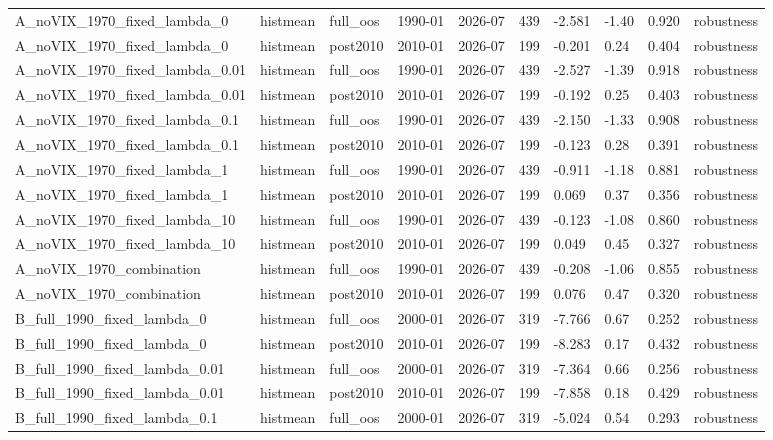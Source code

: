 \begin{table}
\begin{tabular}{lllllrllll}
A\_noVIX\_1970\_fixed\_lambda\_0 & histmean & full\_oos & 1990-01 & 2026-07 & 439 & -2.581 & -1.40 & 0.920 & robustness \\
A\_noVIX\_1970\_fixed\_lambda\_0 & histmean & post2010 & 2010-01 & 2026-07 & 199 & -0.201 & 0.24 & 0.404 & robustness \\
A\_noVIX\_1970\_fixed\_lambda\_0.01 & histmean & full\_oos & 1990-01 & 2026-07 & 439 & -2.527 & -1.39 & 0.918 & robustness \\
A\_noVIX\_1970\_fixed\_lambda\_0.01 & histmean & post2010 & 2010-01 & 2026-07 & 199 & -0.192 & 0.25 & 0.403 & robustness \\
A\_noVIX\_1970\_fixed\_lambda\_0.1 & histmean & full\_oos & 1990-01 & 2026-07 & 439 & -2.150 & -1.33 & 0.908 & robustness \\
A\_noVIX\_1970\_fixed\_lambda\_0.1 & histmean & post2010 & 2010-01 & 2026-07 & 199 & -0.123 & 0.28 & 0.391 & robustness \\
A\_noVIX\_1970\_fixed\_lambda\_1 & histmean & full\_oos & 1990-01 & 2026-07 & 439 & -0.911 & -1.18 & 0.881 & robustness \\
A\_noVIX\_1970\_fixed\_lambda\_1 & histmean & post2010 & 2010-01 & 2026-07 & 199 & 0.069 & 0.37 & 0.356 & robustness \\
A\_noVIX\_1970\_fixed\_lambda\_10 & histmean & full\_oos & 1990-01 & 2026-07 & 439 & -0.123 & -1.08 & 0.860 & robustness \\
A\_noVIX\_1970\_fixed\_lambda\_10 & histmean & post2010 & 2010-01 & 2026-07 & 199 & 0.049 & 0.45 & 0.327 & robustness \\
A\_noVIX\_1970\_combination & histmean & full\_oos & 1990-01 & 2026-07 & 439 & -0.208 & -1.06 & 0.855 & robustness \\
A\_noVIX\_1970\_combination & histmean & post2010 & 2010-01 & 2026-07 & 199 & 0.076 & 0.47 & 0.320 & robustness \\
B\_full\_1990\_fixed\_lambda\_0 & histmean & full\_oos & 2000-01 & 2026-07 & 319 & -7.766 & 0.67 & 0.252 & robustness \\
B\_full\_1990\_fixed\_lambda\_0 & histmean & post2010 & 2010-01 & 2026-07 & 199 & -8.283 & 0.17 & 0.432 & robustness \\
B\_full\_1990\_fixed\_lambda\_0.01 & histmean & full\_oos & 2000-01 & 2026-07 & 319 & -7.364 & 0.66 & 0.256 & robustness \\
B\_full\_1990\_fixed\_lambda\_0.01 & histmean & post2010 & 2010-01 & 2026-07 & 199 & -7.858 & 0.18 & 0.429 & robustness \\
B\_full\_1990\_fixed\_lambda\_0.1 & histmean & full\_oos & 2000-01 & 2026-07 & 319 & -5.024 & 0.54 & 0.293 & robustness \\

\end{tabular}
\end{table}
